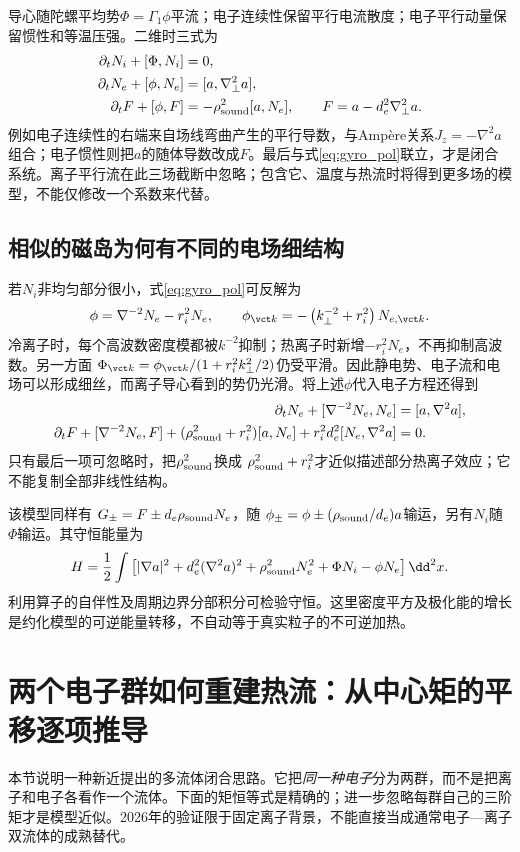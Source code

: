 导心随陀螺平均势$\Phi=\Gamma_1\phi$平流；电子连续性保留平行电流散度；电子平行动量保留惯性和等温压强。二维时三式为
\begin{align}
 \partial_tN_i+[\Phi,N_i]&=0,\\
 \partial_tN_e+[\phi,N_e]&=[a,\nabla_\perp^2a],\\
 \partial_tF+[\phi,F]&=-\rho_{\rm sound}^2[a,N_e],
 \qquad F=a-d_e^2\nabla_\perp^2a.
\end{align}
例如电子连续性的右端来自场线弯曲产生的平行导数，与Ampère关系$J_z=-\nabla^2a$组合；电子惯性则把$a$的随体导数改成$F$。最后与式\eqref{eq:gyro_pol}联立，才是闭合系统。离子平行流在此三场截断中忽略；包含它、温度与热流时将得到更多场的模型，不能仅修改一个系数来代替。

\subsection{相似的磁岛为何有不同的电场细结构}
若$N_i$非均匀部分很小，式\eqref{eq:gyro_pol}可反解为
\begin{equation}
 \phi=\nabla^{-2}N_e-r_i^2N_e,
 \qquad \phi_{\vct k}=-\left(k_\perp^{-2}+r_i^2\right)N_{e,\vct k}.
\end{equation}
冷离子时，每个高波数密度模都被$k^{-2}$抑制；热离子时新增$-r_i^2N_e$，不再抑制高波数。另一方面
$\Phi_{\vct k}=\phi_{\vct k}/(1+r_i^2k_\perp^2/2)$仍受平滑。因此静电势、电子流和电场可以形成细丝，而离子导心看到的势仍光滑。将上述$\phi$代入电子方程还得到
\begin{align}
 \partial_tN_e+[\nabla^{-2}N_e,N_e]&=[a,\nabla^2a],\\
 \partial_tF+[\nabla^{-2}N_e,F]
 +(\rho_{\rm sound}^2+r_i^2)[a,N_e]
 +r_i^2d_e^2[N_e,\nabla^2a]&=0.
\end{align}
只有最后一项可忽略时，把$\rho_{\rm sound}^2$换成
$\rho_{\rm sound}^2+r_i^2$才近似描述部分热离子效应；它不能复制全部非线性结构。

该模型同样有
$G_\pm=F\pm d_e\rho_{\rm sound}N_e$，随
$\phi_\pm=\phi\pm(\rho_{\rm sound}/d_e)a$输运，另有$N_i$随$\Phi$输运。其守恒能量为
\begin{equation}
 H=\frac12\int\left[|\nabla a|^2+d_e^2(\nabla^2a)^2
 +\rho_{\rm sound}^2N_e^2+\Phi N_i-\phi N_e\right]\dd^2x.
\end{equation}
利用算子的自伴性及周期边界分部积分可检验守恒。这里密度平方及极化能的增长是约化模型的可逆能量转移，不自动等于真实粒子的不可逆加热。\citep{E469}

\section{两个电子群如何重建热流：从中心矩的平移逐项推导}
本节说明一种新近提出的多流体闭合思路。它把\emph{同一种电子}分为两群，而不是把离子和电子各看作一个流体。下面的矩恒等式是精确的；进一步忽略每群自己的三阶矩才是模型近似。2026年的验证限于固定离子背景，不能直接当成通常电子—离子双流体的成熟替代。\citep{F635}

